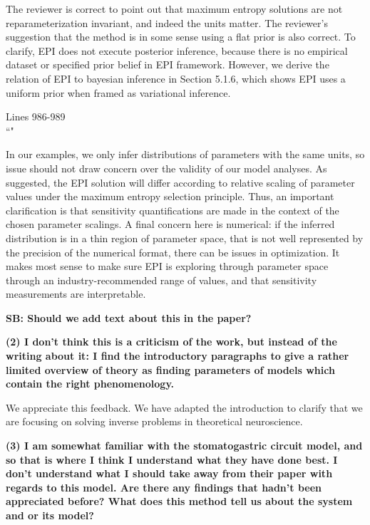 \documentclass[11pt,a4paper]{article}
\begin{document}
The reviewer is correct to point out that maximum entropy solutions are not reparameterization invariant, and indeed the units matter.  The reviewer’s suggestion that the method is in some sense using a flat prior is also correct.  To clarify, EPI does not execute posterior inference, because there is no empirical dataset or specified prior belief in EPI framework.  However, we derive the relation of EPI to bayesian inference in Section 5.1.6, which shows EPI uses a uniform prior when framed as variational inference.

\begin{displayquote}
Lines 986-989 \\
``"
\end{displayquote}
 
In our examples, we only infer distributions of parameters with the same units, so issue should not draw concern over the validity of our model analyses.  As suggested, the EPI solution will differ according to relative scaling of parameter values under the maximum entropy selection principle. Thus, an important clarification is that sensitivity quantifications are made in the context of the chosen parameter scalings. A final concern here is numerical: if the inferred distribution is in a thin region of parameter space, that is not well represented by the precision of the numerical format, there can be issues in optimization.  It makes most sense to make sure EPI is exploring through parameter space through an industry-recommended range of values, and that sensitivity measurements are interpretable.

\textbf{SB: Should we add text about this in the paper?}

\textbf{(2) I don't think this is a criticism of the work, but instead of the writing about it: I find the introductory paragraphs to give a rather limited overview of theory as finding parameters of models which contain the right phenomenology. }

We appreciate this feedback.  We have adapted the introduction to clarify that we are focusing on solving inverse problems in theoretical neuroscience.

\textbf{(3) I am somewhat familiar with the stomatogastric circuit model, and so that is where I think I understand what they have done best. I don't understand what I should take away from their paper with regards to this model. Are there any findings that hadn't been appreciated before? What does this method tell us about the system and or its model? }
\end{document}
